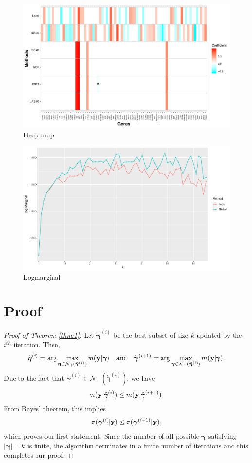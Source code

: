 \documentclass[12pt]{article}
\def\uy{{\bf y}}
\def\bg{{\boldsymbol \gamma}}
\def\ueta{{\boldsymbol \eta}}
\def\ueta{{\boldsymbol \eta}}
\begin{document}
\begin{figure}
  \includegraphics[width=\linewidth]{Heatmap.pdf}
  \caption{Heap map}
  \label{fig:heatmap}
\end{figure}

\begin{figure}
  \includegraphics[width=\linewidth]{Log_marginal.pdf}
  \caption{Logmarginal}
  \label{fig:Logmarginal}
\end{figure}




\newpage
\appendix
\section{Proof}\label{app:01}
\begin{proof}[Proof of Theorem \ref{thm:1}] Let $\tilde{\bg}^{(i)}$ be the best subset of size $k$ updated by the $i^{th}$ iteration. Then,
$$\tilde{\ueta}^{(i)}=\arg\max_{\ueta  \in \mathcal{N}_+(\tilde{\bg}^{(i)}  ) } m(\uy|\bg)\quad \text{and}\quad \tilde{\bg}^{(i+1)} = \arg\max_{\bg  \in \mathcal{N}_-(\tilde{\ueta}^{(i)} ) } m(\uy|\bg).$$
Due to the fact that $\tilde{\bg}^{(i)} \in \mathcal{N}_-(\tilde{\ueta}^{(i)} ) $, we have
$$m(\uy|\tilde{\bg}^{(i)} ) \leq m(\uy|\tilde{\bg}^{(i+1)}).$$
From Bayes' theorem, this implies 
$$\pi(\tilde{\bg}^{(i)}|\uy ) \leq \pi(\tilde{\bg}^{(i+1)}|\uy),$$
which proves our first statement.
Since the number of all possible $\bg$ satisfying $|\bg|=k $ is finite, the algorithm terminates in a finite number of iterations and this completes our proof.
\end{proof}
\end{document}
